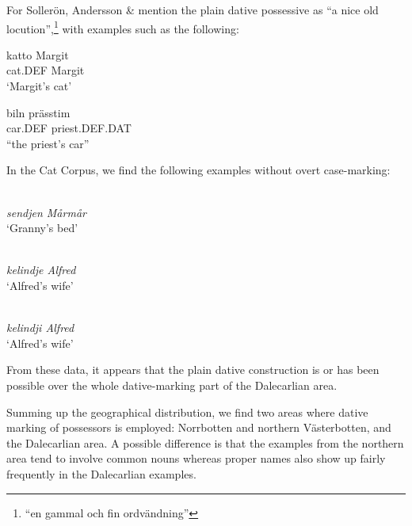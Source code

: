 For Sollerön, Andersson \& \citet[357]{Danielsson1999} mention the plain dative possessive as “a nice old locution”,\footnote{ “en gammal och fin ordvändning”} with examples such as the following:


\ea\label{}
\gll katto  Margit\\
cat.DEF  Margit\\
\glt ‘Margit’s cat’
\z

\ea\label{}
\gll biln  prässtim\\
car.DEF  priest.DEF.DAT\\
\glt “the priest’s car”
\z

In the Cat Corpus, we find the following examples without overt case-marking:

\ea 
\ea 
{}\\
\gl \textit{sendjen Mårmår}\\
\glt ‘Granny’s bed’

\ex 
{}\\
\gl \textit{kelindje Alfred}\\
\glt ‘Alfred’s wife’

\ex 
{}\\
\gl \textit{kelindji Alfred}\\
\glt ‘Alfred’s wife’

\z 
\z



From these data, it appears that the plain dative construction is or has been possible over the whole dative-marking part of the Dalecarlian area. 


Summing up the geographical distribution, we find two areas where dative marking of possessors is employed: Norrbotten and northern Västerbotten, and the Dalecarlian area. A possible difference is that the examples from the northern area tend to involve common nouns whereas proper names also show up fairly frequently in the Dalecarlian examples. 

